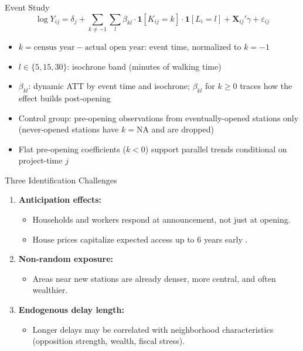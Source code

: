\documentclass{beamer}
\begin{document}
\begin{frame}{Event Study}
\[
  \log Y_{ij} = \delta_j
  + \sum_{k \ne -1}\sum_l \beta_{kl}
    \cdot \mathbf{1}[K_{ij} = k]
    \cdot \mathbf{1}[L_i = l]
  + \mathbf{X}_{ij}'\gamma + \varepsilon_{ij}
\]
\begin{itemize}
  \item $k = \text{census year} - \text{actual open year}$: event time, normalized to $k = -1$
  \item $l \in \{5, 15, 30\}$: isochrone band (minutes of walking time)
  \item $\beta_{kl}$: dynamic ATT by event time and isochrone; $\beta_{kl}$ for $k \ge 0$ traces how the effect builds post-opening
  \item Control group: pre-opening observations from eventually-opened stations only (never-opened stations have $k = \text{NA}$ and are dropped)
  \item Flat pre-opening coefficients ($k < 0$) support parallel trends conditional on project-time $j$
\end{itemize}
\end{frame}

\begin{frame}{Three Identification Challenges}
\small
\begin{enumerate}
  \item \textbf{Anticipation effects:}
    \begin{itemize}
      \item Households and workers respond at announcement, not just at opening.
      \item House prices capitalize expected access up to 6 years early
            \parencite{mcmillenReactionHousePrices2004}.
    \end{itemize}
  \item \textbf{Non-random exposure:}
    \begin{itemize}
      \item Areas near new stations are already denser, more central, and often wealthier.
    \end{itemize}
  \item \textbf{Endogenous delay length:}
    \begin{itemize}
      \item Longer delays may be correlated with neighborhood characteristics
            (opposition strength, wealth, fiscal stress).
    \end{itemize}
\end{enumerate}
\end{frame}
\end{document}
